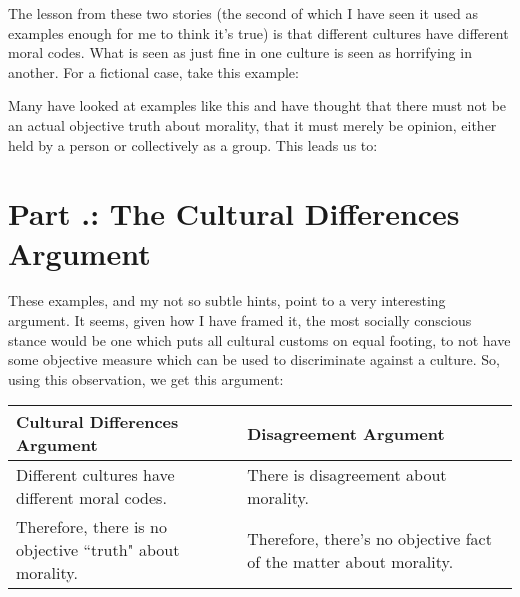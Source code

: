 The lesson from these two stories (the second of which I have seen it used as examples enough for me to think it's true) is that different cultures have different moral codes. What is seen as just fine in one culture is seen as horrifying in another. For a fictional case, take this example:


Many have looked at examples like this and have thought that there must not be an actual objective truth about morality, that it must merely be opinion, either held by a person or collectively as a group. This leads us to:

\section{Part \thechapcount.\theseccount: The Cultural Differences Argument}

These examples, and my not so subtle  hints, point to a very interesting argument. It seems, given how I have framed it, the most socially conscious stance would be one which puts all cultural customs on equal footing, to not have some objective measure which can be used to discriminate against a culture. So, using this observation, we get this argument:
\noindent
\begin{tabular}{p{2.75in}|p{2.75in}}
Cultural Differences Argument&Disagreement Argument\\\hline
    Different cultures have different moral codes.&There is disagreement about morality.\\
    Therefore, there is no objective ``truth" about morality.&Therefore, there's no objective fact of the matter about morality.
\end{tabular}

